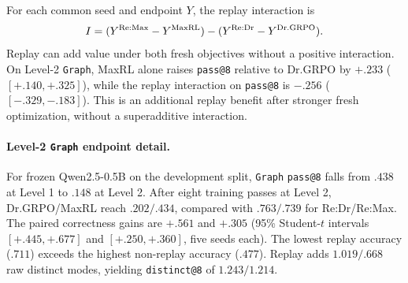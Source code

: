 \documentclass{article}
\newcommand{\1}{\mathbf 1}
\newcommand{\pmd}{\texttt{PCMD}}
\theoremstyle{remark}
\theoremstyle{definition}
\theoremstyle{plain}
\begin{document}
For each common seed and endpoint $Y$, the replay interaction is
\[
 I=(Y^{\rm Re:Max}-Y^{\rm MaxRL})
    -(Y^{\rm Re:Dr}-Y^{\rm Dr.GRPO}).
\]
Replay can add value under both fresh objectives without a positive
interaction. On Level-2 \texttt{Graph}, MaxRL alone raises \texttt{pass@8} relative to Dr.GRPO
by $+.233$ ($[+.140,+.325]$), while the replay interaction on \texttt{pass@8} is
$-.256$ ($[-.329,-.183]$). This is an additional replay benefit after
stronger fresh optimization, without a superadditive interaction.

\begin{table}[!htbp]
  \centering
  \caption{\textbf{A stronger fresh objective need not increase replay's additional benefit.}
  Five common seeds per domain for all four methods. The interaction is
  $(\mathrm{Re:Max}-\mathrm{MaxRL})-(\mathrm{Re:Dr}-\mathrm{Dr.GRPO})$.
  Here $P_8=\texttt{pass@8}$, $D_8=\texttt{distinct@8}$, and $B_8=D_8-P_8$.
  Entries give paired means and nominal 95\% Student-$t$ intervals.
  Both count metrics remain coupled to correctness. Four-arm \pmd{}
  comparisons have five eligible seeds in \texttt{Python}, four in \texttt{MathIR}, three in
  \texttt{Graph}, two in \texttt{PantryPlan}, and none in \texttt{Countdown}, so they do not share this
  table's five-seed population.}

\label{tab:level2-factorial-contrasts}
  \scriptsize
  \setlength{\tabcolsep}{3pt}
\end{table}


\paragraph{Level-2 \texttt{Graph} endpoint detail.}
\label{app:levels-numerical-detail}
For frozen Qwen2.5-0.5B on the development split, \texttt{Graph} \texttt{pass@8}
falls from $.438$ at Level 1 to $.148$ at Level 2. After eight training
passes at Level 2, Dr.GRPO/MaxRL reach $.202/.434$, compared with $.763/.739$
for Re:Dr/Re:Max. The paired correctness gains are $+.561$ and $+.305$
(95\% Student-$t$ intervals $[+.445,+.677]$ and $[+.250,+.360]$, five seeds
each). The lowest replay accuracy ($.711$) exceeds the highest non-replay
accuracy ($.477$). Replay adds $1.019/.668$ raw distinct modes, yielding
\texttt{distinct@8} of $1.243/1.214$.
\end{document}
